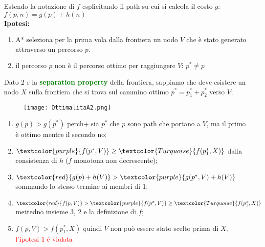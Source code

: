 \documentclass{article}
\begin{document}
Estendo la notazione di $f$ esplicitando il path su cui si calcola il costo $g$: $f(p,n)=g(p)+h(n)$
\\ \textbf{Ipotesi:}
\begin{enumerate}
    \item A* seleziona per la prima vola dalla frontiera un nodo $V$ che è stato generato attraverso un percorso $p$.
    \item il percorso $p$ non è il percorso ottimo per raggiungere $V$: $p^*\neq p$
\end{enumerate}
Dato 2 e la \textcolor{green}{\textbf{separation property}} della frontiera, sappiamo che deve esistere un nodo $X$ sulla frontiera che si trova sul cammino ottimo $p^*=p^*_1+p^*_2$ verso $V$;
\begin{figure}[H]
    \centering
    \texttt{[image: OttimalitaA2.png]}
\end{figure}

\begin{enumerate}
    \item $g(p)>g(p^*)$ perch+ sia $p^*$ che $p$ sono path che portano a $V$, ma il primo è ottimo mentre il secondo no;
    \item $\textcolor{purple}{f(p^*, V)} \geq \textcolor{Turquoise}{f(p^*_1,X)}$ dalla consistenza di $h$ ($f$ monotona non decrescente);
    \item $\textcolor{red}{g(p)+h(V)} > \textcolor{purple}{g(p^*,V) + h(V)}$ sommando lo stesso termine ai membri di 1;
    \item $\textcolor{red}{f(p,V)}> \textcolor{purple}{f(p^x,V)} \geq \textcolor{Turquoise}{f(p^x_1,X)}$ mettedno insieme 3, 2 e la definizione di $f$;
    \item $f(p,V) > f(p^*_1,X)$ quindi $V$ non può essere stato scelto prima di $X$, \textcolor{red}{l'ipotesi 1 è violata}
\end{enumerate}
\end{document}
